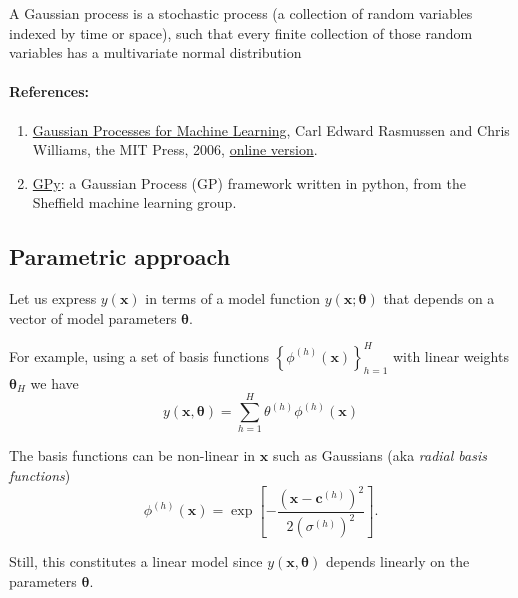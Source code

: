 \documentclass[%
oneside,                 %
final,                   %
10pt]{article}
\newenvironment{notice_mdfboxadmon}[1][]{
\begin{notice_mdfboxmdframed}[frametitle=#1]
}
{
\end{notice_mdfboxmdframed}
}
\begin{document}
\begin{notice_mdfboxadmon}
A Gaussian process is a stochastic process (a collection of random variables indexed by time or space), such that every finite collection of those random variables has a multivariate normal distribution
\end{notice_mdfboxadmon} %



\paragraph{References:}
\begin{enumerate}
\item \href{{http://www.gaussianprocess.org/gpml}}{Gaussian Processes for Machine Learning}, Carl Edward Rasmussen and Chris Williams, the MIT Press, 2006, \href{{http://www.gaussianprocess.org/gpml/chapters}}{online version}.

\item \href{{https://sheffieldml.github.io/GPy/}}{GPy}: a Gaussian Process (GP) framework written in python, from the Sheffield machine learning group.
\end{enumerate}

\noindent
\subsection{Parametric approach}

Let us express $y(\boldsymbol{x})$ in terms of a model function $y(\boldsymbol{x}; \boldsymbol{\theta})$ that depends on a vector of model parameters $\boldsymbol{\theta}$.

For example, using a set of basis functions $\left\{ \phi^{(h)} (\boldsymbol{x}) \right\}_{h=1}^H$ with linear weights $\boldsymbol{\theta}_H$ we have
\[
y (\boldsymbol{x}, \boldsymbol{\theta}) = \sum_{h=1}^H \theta^{(h)} \phi^{(h)} (\boldsymbol{x})
\]


\begin{notice_mdfboxadmon}[Notice]
The basis functions can be non-linear in $\boldsymbol{x}$ such as Gaussians (aka \emph{radial basis functions})
\[
\phi^{(h)} (\boldsymbol{x}) = \exp \left[ -\frac{\left( \boldsymbol{x} - \boldsymbol{c}^{(h)} \right)^2}{2 (\sigma^{(h)})^2} \right].
\]

Still, this constitutes a linear model since $y (\boldsymbol{x}, \boldsymbol{\theta})$ depends linearly on the parameters $\boldsymbol{\theta}$.
\end{notice_mdfboxadmon} %
\end{document}
